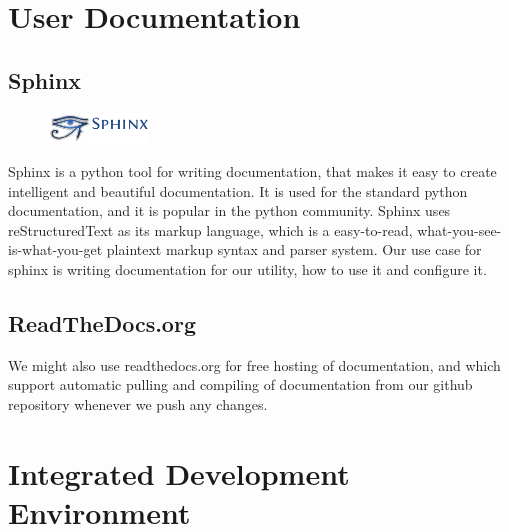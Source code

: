 \section{User Documentation}
\label{sec:pre:docs}

\subsection{Sphinx}
\begin{figure}
	\begin{center}
	\vspace{-30pt}
		\includegraphics[width=2.7cm]{./planning/img/sphinx_logo}
	\vspace{-30pt}
	\end{center}
\end{figure}
Sphinx is a python tool for writing documentation, that makes it easy to create
intelligent and beautiful documentation. It is used for the standard python
documentation, and it is  popular in the python community. Sphinx uses
reStructuredText as its markup language, which is a easy-to-read,
what-you-see-is-what-you-get plaintext markup syntax and parser system. Our use
case for sphinx is writing documentation for our utility, how to use it and
configure it.

\subsection{ReadTheDocs.org}
We might also use readthedocs.org for free hosting of
documentation, and which support automatic pulling and compiling of
documentation from our github repository whenever we push any changes.

\section{Integrated Development Environment}
\label{sec:pre:ide}

